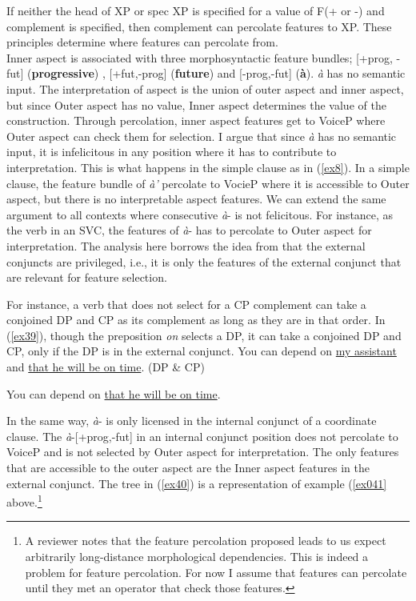 \documentclass[output=paper,colorlinks,citecolor=brown]{langscibook}
\begin{document}
\ex If neither the head of XP or spec XP is specified for a value of F(+ or -) and complement is specified, then complement can percolate features to XP. 
\z
\z
These principles determine where features can percolate from.\\ 
Inner aspect is associated with three morphosyntactic feature bundles; [+prog, -fut] (\textbf{progressive}) , [+fut,-prog] (\textbf{future}) and [-prog,-fut] (\textbf{\`a}).  \emph{\`a} has no semantic input. The interpretation of aspect is the union of outer aspect and inner aspect, but since Outer aspect has no value, Inner aspect determines the value of the construction. Through percolation, inner aspect features get to VoiceP where Outer aspect can check them for selection.  I argue that since \emph{\`a} has no semantic input, it is infelicitous in any position where it has to contribute to interpretation. This is what happens in the simple clause as in (\ref{ex8}). In a simple clause, the feature bundle of \emph{\`a'}  percolate to VocieP where it is accessible to Outer aspect, but there is no interpretable aspect features. We can extend the same argument to all contexts where consecutive \emph{\`a}- is not felicitous. For instance, as the verb in an SVC, the features of \emph{\`a}- has to percolate to Outer aspect for interpretation. The analysis here borrows the idea from  \citet{Zhang2009} that the external conjuncts are privileged, i.e., it is only the features of the external conjunct that are relevant for feature selection. 

For instance, a verb that does not select for a CP complement can take a conjoined DP and CP as its complement as long as they are in that order. In (\ref{ex39}), though the preposition \emph{ on} selects a DP, it can take a conjoined DP and CP, only if the DP is in the external conjunct.
\ea\label{ex39}
\ea You can depend on \underline{my assistant} and \underline{that he will be on time}. (DP \& CP)

\ex You can depend on \underline{that he will be on time}.

\z 
\z  In the same way, \emph{\`a}-  is only licensed in the internal conjunct of a coordinate clause. The \emph{\`a}-[+prog,-fut] in an internal conjunct position does not percolate to VoiceP and is not selected by Outer aspect for interpretation. The only features that are accessible to the outer aspect are the Inner aspect features in the external conjunct. The tree in (\ref{ex40}) is a representation of example (\ref{ex041} above.\footnote{A reviewer notes that the feature percolation proposed leads to us expect arbitrarily long-distance morphological dependencies. This is indeed a problem for feature percolation. For now I assume that features can percolate until they met an operator that check those features.}  
\ea \label{ex40}
\end{document}
